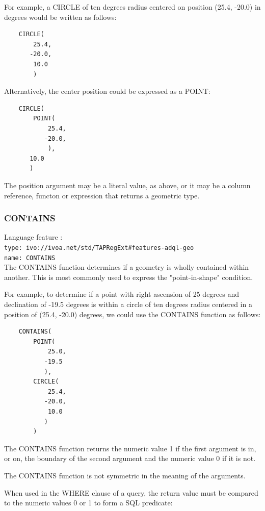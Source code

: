 \documentclass[11pt,a4paper]{ivoa}
\begin{document}
For example, a CIRCLE of ten degrees radius centered on position
(25.4, -20.0) in degrees would be written as follows:

\begin{verbatim}
    CIRCLE(
        25.4,
       -20.0,
        10.0
        )
\end{verbatim}

Alternatively, the center position could be expressed as a POINT:

\begin{verbatim}
    CIRCLE(
        POINT(
            25.4,
           -20.0,
            ),
       10.0
       )
\end{verbatim}

The position argument may be a literal value, as above, or it may be a
column reference, functon or expression that returns a geometric type.

\subsubsection{CONTAINS}
\label{sec:functions.geom.contains}
{\footnotesize Language feature :}\\
{\footnotesize \verb|type: ivo://ivoa.net/std/TAPRegExt#features-adql-geo|}\\
{\footnotesize \verb|name: CONTAINS|}\\

The CONTAINS function determines if a geometry is wholly contained within
another. This is most commonly used to express the "point-in-shape" condition.

For example, to determine if a point with right ascension of 25 degrees
and declination of -19.5 degrees is within a circle of ten degrees radius
centered in a position of (25.4, -20.0) degrees,
we could use the CONTAINS function as follows:

\begin{verbatim}
    CONTAINS(
        POINT(
            25.0,
           -19.5
           ),
        CIRCLE(
            25.4,
           -20.0,
            10.0
           )
        )
\end{verbatim}

The CONTAINS function returns the numeric value 1 if the first argument
is in, or on, the boundary of the second argument and the numeric value 0
if it is not.

The CONTAINS function is not symmetric in the meaning of the arguments.

When used in the WHERE clause of a query, the return value must be compared
to the numeric values 0 or 1 to form a SQL predicate:
\end{document}

